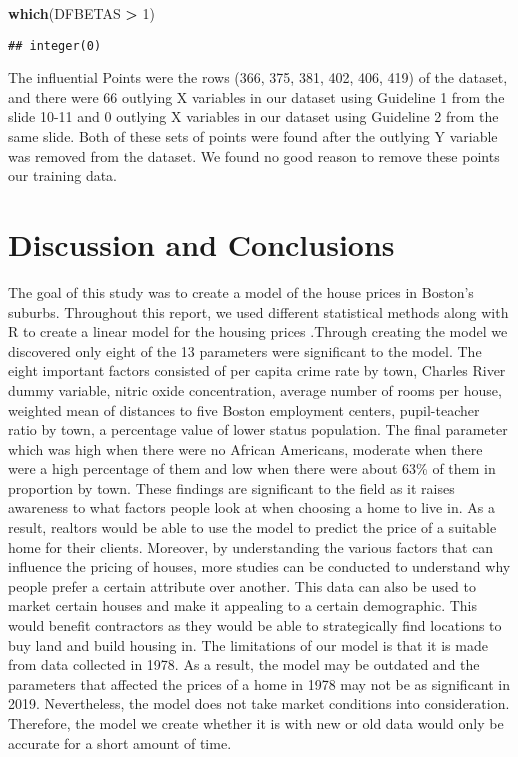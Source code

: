 \documentclass[]{article}
\newenvironment{Shaded}{\begin{snugshade}}{\end{snugshade}}
\newcommand{\KeywordTok}[1]{\textcolor[rgb]{0.13,0.29,0.53}{\textbf{#1}}}
\newcommand{\DecValTok}[1]{\textcolor[rgb]{0.00,0.00,0.81}{#1}}
\newcommand{\StringTok}[1]{\textcolor[rgb]{0.31,0.60,0.02}{#1}}
\newcommand{\OperatorTok}[1]{\textcolor[rgb]{0.81,0.36,0.00}{\textbf{#1}}}
\newcommand{\NormalTok}[1]{#1}
\begin{document}
\begin{Shaded}
\begin{Highlighting}[]
\KeywordTok{which}\NormalTok{(DFBETAS }\OperatorTok{>}\StringTok{ }\DecValTok{1}\NormalTok{)}
\end{Highlighting}
\end{Shaded}

\begin{verbatim}
## integer(0)
\end{verbatim}

The influential Points were the rows (366, 375, 381, 402, 406, 419) of
the dataset, and there were 66 outlying X variables in our dataset using
Guideline 1 from the slide 10-11 and 0 outlying X variables in our
dataset using Guideline 2 from the same slide. Both of these sets of
points were found after the outlying Y variable was removed from the
dataset. We found no good reason to remove these points our training
data.

\section{Discussion and Conclusions}\label{discussion-and-conclusions}

The goal of this study was to create a model of the house prices in
Boston's suburbs. Throughout this report, we used different statistical
methods along with R to create a linear model for the housing prices
.Through creating the model we discovered only eight of the 13
parameters were significant to the model. The eight important factors
consisted of per capita crime rate by town, Charles River dummy
variable, nitric oxide concentration, average number of rooms per house,
weighted mean of distances to five Boston employment centers,
pupil-teacher ratio by town, a percentage value of lower status
population. The final parameter which was high when there were no
African Americans, moderate when there were a high percentage of them
and low when there were about 63\% of them in proportion by town. These
findings are significant to the field as it raises awareness to what
factors people look at when choosing a home to live in. As a result,
realtors would be able to use the model to predict the price of a
suitable home for their clients. Moreover, by understanding the various
factors that can influence the pricing of houses, more studies can be
conducted to understand why people prefer a certain attribute over
another. This data can also be used to market certain houses and make it
appealing to a certain demographic. This would benefit contractors as
they would be able to strategically find locations to buy land and build
housing in. The limitations of our model is that it is made from data
collected in 1978. As a result, the model may be outdated and the
parameters that affected the prices of a home in 1978 may not be as
significant in 2019. Nevertheless, the model does not take market
conditions into consideration. Therefore, the model we create whether it
is with new or old data would only be accurate for a short amount of
time.
\end{document}
